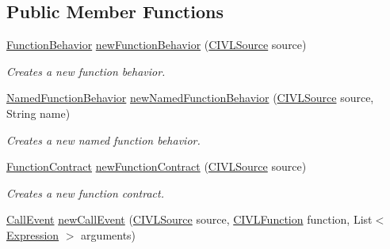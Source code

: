 \subsection*{Public Member Functions}
\begin{DoxyCompactItemize}
\item 
\hyperlink{interfaceedu_1_1udel_1_1cis_1_1vsl_1_1civl_1_1model_1_1IF_1_1contract_1_1FunctionBehavior}{Function\+Behavior} \hyperlink{classedu_1_1udel_1_1cis_1_1vsl_1_1civl_1_1model_1_1common_1_1contract_1_1CommonContractFactory_a50404369c7b86491f935479812f174b8}{new\+Function\+Behavior} (\hyperlink{interfaceedu_1_1udel_1_1cis_1_1vsl_1_1civl_1_1model_1_1IF_1_1CIVLSource}{C\+I\+V\+L\+Source} source)
\begin{DoxyCompactList}\small\item\em Creates a new function behavior. \end{DoxyCompactList}\item 
\hyperlink{interfaceedu_1_1udel_1_1cis_1_1vsl_1_1civl_1_1model_1_1IF_1_1contract_1_1NamedFunctionBehavior}{Named\+Function\+Behavior} \hyperlink{classedu_1_1udel_1_1cis_1_1vsl_1_1civl_1_1model_1_1common_1_1contract_1_1CommonContractFactory_a192315afc5c4314e6d9394cb90dad043}{new\+Named\+Function\+Behavior} (\hyperlink{interfaceedu_1_1udel_1_1cis_1_1vsl_1_1civl_1_1model_1_1IF_1_1CIVLSource}{C\+I\+V\+L\+Source} source, String name)
\begin{DoxyCompactList}\small\item\em Creates a new named function behavior. \end{DoxyCompactList}\item 
\hyperlink{interfaceedu_1_1udel_1_1cis_1_1vsl_1_1civl_1_1model_1_1IF_1_1contract_1_1FunctionContract}{Function\+Contract} \hyperlink{classedu_1_1udel_1_1cis_1_1vsl_1_1civl_1_1model_1_1common_1_1contract_1_1CommonContractFactory_a2b92d5b4d00d175a2ae3e63b640f8346}{new\+Function\+Contract} (\hyperlink{interfaceedu_1_1udel_1_1cis_1_1vsl_1_1civl_1_1model_1_1IF_1_1CIVLSource}{C\+I\+V\+L\+Source} source)
\begin{DoxyCompactList}\small\item\em Creates a new function contract. \end{DoxyCompactList}\item 
\hyperlink{interfaceedu_1_1udel_1_1cis_1_1vsl_1_1civl_1_1model_1_1IF_1_1contract_1_1CallEvent}{Call\+Event} \hyperlink{classedu_1_1udel_1_1cis_1_1vsl_1_1civl_1_1model_1_1common_1_1contract_1_1CommonContractFactory_a65e7229aa3b81e5a7621410bcfcfd135}{new\+Call\+Event} (\hyperlink{interfaceedu_1_1udel_1_1cis_1_1vsl_1_1civl_1_1model_1_1IF_1_1CIVLSource}{C\+I\+V\+L\+Source} source, \hyperlink{interfaceedu_1_1udel_1_1cis_1_1vsl_1_1civl_1_1model_1_1IF_1_1CIVLFunction}{C\+I\+V\+L\+Function} function, List$<$ \hyperlink{interfaceedu_1_1udel_1_1cis_1_1vsl_1_1civl_1_1model_1_1IF_1_1expression_1_1Expression}{Expression} $>$ arguments)

\end{DoxyCompactItemize}
